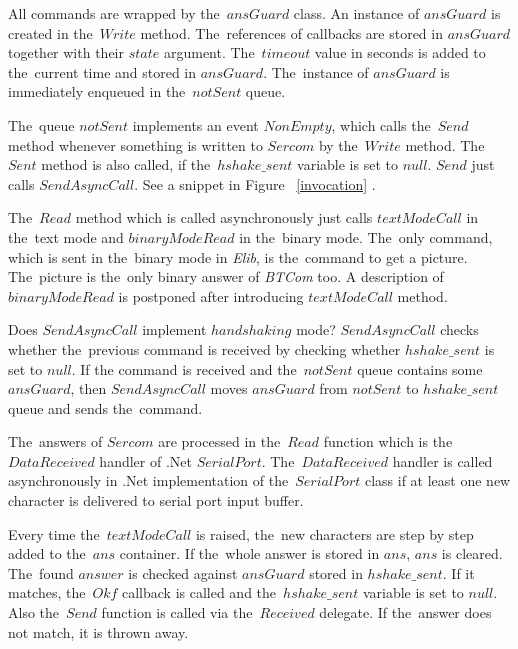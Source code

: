   All commands are wrapped by the~$ansGuard$ class. An instance of $ansGuard$ is created in the~$Write$ method.
  The~references of callbacks are stored in $ansGuard$ together with their $state$ argument.  
  The~$timeout$ value in seconds is added to the~current time and stored in $ansGuard$.
  The~instance of $ansGuard$ is immediately enqueued in the~$notSent$ queue.

  The~queue $notSent$ implements an event $NonEmpty$, which calls the~$Send$ method whenever something is written
  to $Sercom$ by the~$Write$ method. The~$Sent$ method is also called, if the~$hshake\_sent$ variable is set to $null$.
  $Send$ just calls $SendAsyncCall$. See a snippet in Figure ~\ref{invocation} .

  The~$Read$ method which is called asynchronously just calls $textModeCall$
  in the~text mode and $binaryModeRead$ in the~binary mode.
  The~only command, which is sent in the~binary mode in {\it Elib}, is the~command to get a picture.
  The~picture is the~only binary answer of {\it BTCom} too.
  A description of $binaryModeRead$ is postponed after  
  introducing $textModeCall$ method.

  Does $SendAsyncCall$ implement $handshaking$ mode?
  $SendAsyncCall$ checks whether the~previous command is received by
  checking whether $hshake\_sent$ is set to $null$.
  If the command is received and the~$notSent$ queue contains some $ansGuard$, 
  then $SendAsyncCall$ moves $ansGuard$ from $notSent$ to $hshake\_sent$
  queue and sends the~command. 

  The~answers of $Sercom$ are processed in the~$Read$ function
  which is the~$DataReceived$ handler of .Net $SerialPort$. The~$DataReceived$ handler is called asynchronously
  in .Net implementation of the~$SerialPort$ class if at least one new character is delivered to
  serial port input buffer. 

  
  Every time the~$textModeCall$ is raised, the~new characters are step by step
  added to the~$ans$ container. If the~whole answer is stored in $ans$, $ans$ is cleared.
  The~found $answer$ is checked against $ansGuard$ stored in $hshake\_sent$.
  If it matches, the~$Okf$ callback is called and the~$hshake\_sent$ variable is set to $null$. 
  Also the~$Send$ function is called via the~$Received$ delegate. If the~answer does not match, it is thrown away. 
  
